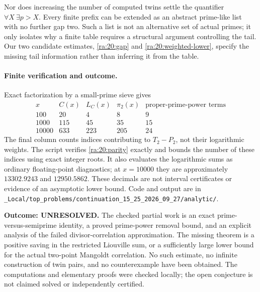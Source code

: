 \documentclass[11pt]{article}
\begin{document}
Nor does increasing the number of computed twins settle the quantifier
$\forall X\ \exists p>X$. Every finite prefix can be extended as an
abstract prime-like list with no further gap two. Such a list is not an
alternative set of actual primes; it only isolates why a finite table
requires a structural argument controlling the tail. Our two candidate
estimates, \eqref{ra:20:gap} and \eqref{ra:20:weighted-lower}, specify
the missing tail information rather than inferring it from the table.

\paragraph{Finite verification and outcome.}
Exact factorization by a small-prime sieve gives
\[
\begin{array}{r|r|r|r|r}
x&C(x)&L_C(x)&\pi_2(x)&\text{proper-prime-power terms}\\\hline
100&20&4&8&9\\1000&115&45&35&15\\
10000&633&223&205&24
\end{array}
\]
The final column counts indices contributing to $T_2-P_2$, not their
logarithmic weights. The script verifies \eqref{ra:20:parity} exactly
and bounds the number of these indices using exact integer roots.
It also evaluates the logarithmic sums as ordinary floating-point
diagnostics; at $x=10000$ they are approximately $13302.9243$ and
$12950.5862$. These decimals are not interval certificates or evidence
of an asymptotic lower bound. Code and output are in
\texttt{\_Local/top\_problems/continuation\_15\_25\_2026\_09\_27/analytic/}.

\textbf{Outcome: UNRESOLVED.} The checked partial work is an exact
prime-versus-semiprime identity, a proved prime-power removal bound, and
an explicit analysis of the failed divisor-correlation approximation.
The missing theorem is a positive saving in the restricted Liouville
sum, or a sufficiently large lower bound for the actual two-point
Mangoldt correlation. No such estimate, no infinite construction of
twin pairs, and no counterexample have been obtained. The computations
and elementary proofs were checked locally; the open conjecture is not
claimed solved or independently certified.
\end{document}
